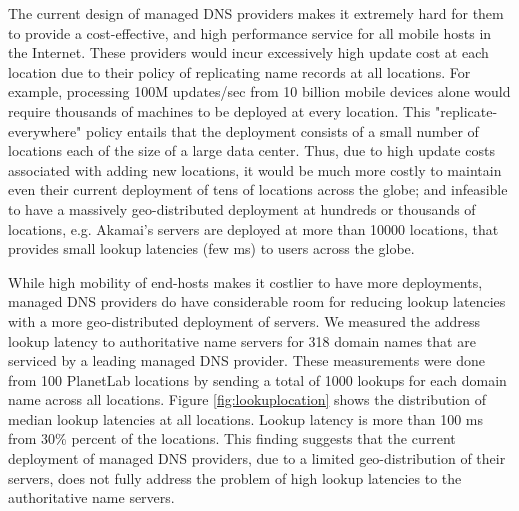 {The current design of managed DNS providers makes it extremely hard for them to provide  a cost-effective, and high performance  service for all mobile hosts in the Internet. These providers would incur excessively high update cost at each location due to their policy of replicating name records at all locations. For example, processing 100M updates/sec from 10 billion mobile devices alone would require thousands of machines to be deployed at every location. This "replicate-everywhere" policy entails that the deployment consists of a small number of locations each of the size of a large data center. Thus, due to high update costs associated with adding new locations, it would be much more costly to maintain even their current deployment of tens of locations across the globe;   and  infeasible to have a massively geo-distributed deployment at hundreds or thousands of locations, e.g. Akamai's servers are deployed at more than 10000 locations, that provides small lookup latencies (few ms) to users across the globe. 

While high mobility of end-hosts makes it costlier to have more deployments, managed DNS providers do have considerable room for reducing lookup latencies with a more geo-distributed deployment of servers. We measured the address lookup latency to authoritative name servers for 318 domain names that are serviced by a leading managed DNS provider. These measurements were done from 100 PlanetLab locations by sending a total of 1000 lookups for each domain name across all locations. Figure \ref{fig:lookuplocation} shows the distribution of median lookup latencies at all locations. Lookup latency is more than 100 ms from  30\% percent of the locations. This finding suggests that the current deployment of managed DNS providers, due to a limited geo-distribution of their servers, does not fully address the problem of high lookup latencies to the authoritative name servers.



}
